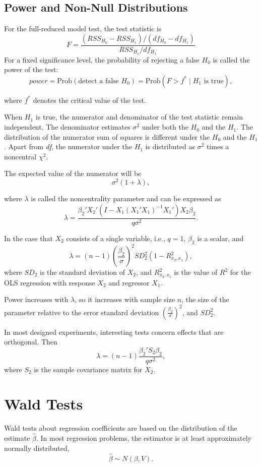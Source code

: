 \documentclass[14pt]{extarticle}
\begin{document}
\subsection*{Power and Non-Null Distributions}

\noindent
For the full-reduced model test, the test statistic is 
\[
F = \frac{(RSS_{H_0} - RSS_{H_1}) / (df_{H_0} - df_{H_1})}{RSS_{H_1} / df_{H_1}}
\]
For a fixed significance level, the probability of rejecting a false $H_0$ is called the power of the test:
\[
power = \text{Prob}(\text{detect a false } H_0)
= \text{Prob}(F > f^* \mid H_1 \text{ is true}),
\]

where $f^*$ denotes the critical value of the test.
\vspace{0.5cm}

When $H_1$ is true, the numerator and denominator of the test statistic remain independent. The denominator estimates $\sigma^2$ under both the $H_0$ and the $H_1$. The distribution of the numerator sum of squares is different under the $H_0$ and the $H_1$. Apart from \textit{df}, the numerator under the $H_1$ is distributed as $\sigma^2$ times a noncentral $\chi^2$.

The expected value of the numerator will be
\[
\sigma^2(1 + \lambda),
\]

where $\lambda$ is called the noncentrality parameter and can be expressed as
\[
\lambda = \frac{\beta_2' X_2' \left( I - X_1 \left( X_1' X_1 \right)^{-1} X_1' \right) X_2 \beta_2}{q \sigma^2}.
\]

In the case that $X_2$ consists of a single variable, i.e., $q = 1$, $\beta_2$ is a scalar, and
\[
\lambda = (n - 1) \left( \frac{\beta_2}{\sigma} \right)^2 SD_2^2 \left( 1 - R_{x_2, x_1}^2 \right),
\]
where $SD_2$ is the standard deviation of $X_2$, and $R_{x_2, x_1}^2$ is the value of $R^2$ for the OLS regression with response $X_2$ and regressor $X_1$.

Power increases with $\lambda$, so it increases with sample size $n$, the size of the parameter relative to the error standard deviation $\left(\frac{\beta_2}{\sigma}\right)^2$, and $SD_2^2$. 

In most designed experiments, interesting tests concern effects that are orthogonal. Then
\[
\lambda = (n - 1) \frac{\beta_2' S_2 \beta_2}{q \sigma^2},
\]
where $S_2$ is the sample covariance matrix for $X_2$.

\section*{Wald Tests}
Wald tests about regression coefficients are based on the distribution of the estimate $\hat{\beta}$. In most regression problems, the estimator is at least approximately normally distributed,
\[
\hat{\beta} \sim N(\beta, V).
\]
\vspace{1cm}
\end{document}
